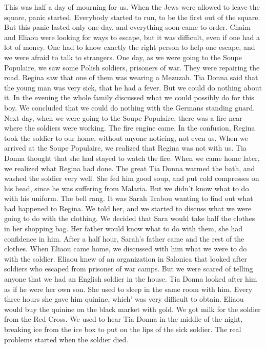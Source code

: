 This was half a day of mourning for us.
When the Jews were allowed to leave the square, panic started.
Everybody started to run, to be the first out of the square.
But this panic 
lasted only one day, and everything soon came to order.
Chaim and Eliaou 
were looking for ways to escape, but it was difficult, even if one had 
a lot of money.
One had to know exactly the right person to help one 
escape, and we were afraid to talk to strangers.
One day, as we were going to the Soupe Populaire, we saw some
Polish soldiers, prisoners of war.
They were repairing the road.
Regina 
saw that one of them was wearing a Mezuzah.
Tia Donna said that the 
young man was very sick, that he had a fever.
But we could do nothing 
about it.
In the evening the whole family discussed what we could possibly 
do for this boy.
We concluded that we could do nothing with the Germans standing guard.
Next day, when we were going to the Soupe Populaire,
there was a fire near where the soldiers were working.
The fire engine 
came.
In the confusion, Regina took the soldier to our home, without 
anyone noticing, not even us.
When we arrived at the Soupe Populaire, we 
realized that Regina was not with us.
Tia Donna thought that she had 
stayed to watch the fire.
When we came home later, we realized what Regina had done.
The 
great Tia Donna warmed the bath, and washed the soldier very well.
She 
fed him good soup, and put cold compresses on his head, since he was 
suffering from Malaria.
But we didn't know what to do with his uniform.
The bell rang.
It was Sarah Trabou wanting to find out what had happened 
to Regina.
We told her, and we started to discuss what we were going to 
do with the clothing.
We decided that Sara would take half the clothes 
in her shopping bag.
Her father would know what to do with them, she 
had confidence in him.
After a half hour, Sarah's father came and 
the rest of the clothes.
When Eliaou came home, we discussed with him what we were to do with 
the soldier.
Eliaou knew of an organization in Salonica that looked 
after soldiers who escaped from prisoner of war camps.
But we were 
scared of telling anyone that we had an English soldier in the house.
Tia Donna looked after him as if he were her own son.
She used to sleep 
in the same room with him.
Every three hours she gave him quinine, which' 
was very difficult to obtain.
Eliaou would buy the quinine on the black 
market with gold.
We got milk for the soldier from the Red Cross.
We used to hear Tia Donna in the middle of the night, breaking ice from 
the ice box to put on the lips of the sick soldier.
The real problems started when the soldier died.
